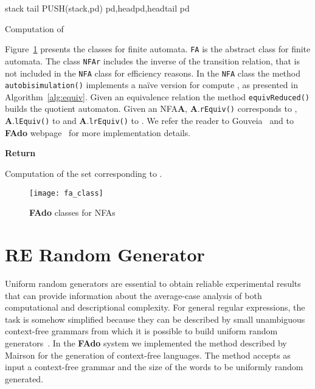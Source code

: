 \documentclass{llncs}
\newcommand{\FAdo}{{\bf FAdo}\xspace}
\newcommand{\NFA}{NFA\xspace}
\newcommand{\nfas}{NFAs\xspace}
\newcommand{\re}{RE\xspace}
\begin{document}
{\small
\vspace{-0.5cm}
\begin{algorithm}[H]
  \begin{algorithmic}[]
    \STATE 
    \STATE 
    \STATE 
    \STATE stack 
    \STATE tail
    \STATE PUSH(stack,pd)
    \ENDIF
    \STATE pd,headpd,headtail
    \ENDFOR
    \STATE pd
    \ENDIF
    \ENDWHILE
  \end{algorithmic}
  \caption{Computation of }
  \label{alg:nfapd}
\end{algorithm}
}
\vspace{-0.5cm}

Figure~\ref{fig:faclass} presents the classes for finite automata.
\texttt{FA} is the abstract class for finite automata. The class
\texttt{NFAr} includes the inverse of the transition relation, that is
not included in the \texttt{NFA} class for efficiency reasons. In the
\texttt{NFA} class the method \texttt{autobisimulation()} implements a
na\"ive version for compute , as presented in
Algorithm~\ref{alg:equiv}. Given an equivalence
relation the method \texttt{equivReduced()} builds the quotient
automaton.  Given an \NFA \textbf{A}, \textbf{A}.\texttt{rEquiv()}
corresponds to , \textbf{A}.\texttt{lEquiv()} to
 and \textbf{A}.\texttt{lrEquiv()} to
. We refer the reader to
Gouveia~\cite{gouveia09:_de_initos_pequen} and to \FAdo
webpage~\cite{fado} for more implementation details.

{\small \vspace{-0.3cm}\begin{algorithm}[H]
 \begin{algorithmic}[]
    \STATE 
    \FOR{}
    \IF{}
    \STATE 
    \ENDIF
    \ENDFOR
    \WHILE{}
    \STATE 
    \ENDWHILE
    \STATE 
    \STATE \textbf{Return} 
  \end{algorithmic}
  \caption{Computation of the set  corresponding to .}\label{alg:equiv}
\end{algorithm}}

\begin{figure}
\begin{center}
  \texttt{[image: fa\_class]}
\end{center}
\caption{\FAdo classes for \nfas}
\label{fig:faclass}
\vspace{-1cm}
\end{figure}
\section{\re Random Generator}
\label{sec:radom}
Uniform random generators are essential to obtain reliable
experimental results that can provide information about the
average-case analysis of both computational and descriptional
complexity.  For general regular expressions, the task is somehow
simplified because they can be described by small unambiguous
context-free grammars from which it is possible to build uniform
random
generators~\cite{mairson94:_gener}. In the \FAdo system we implemented the method described by Mairson
\cite{mairson94:_gener} for the generation of context-free
languages. The method accepts as input a context-free grammar and the
size of the words to be uniformly random generated.
\end{document}
